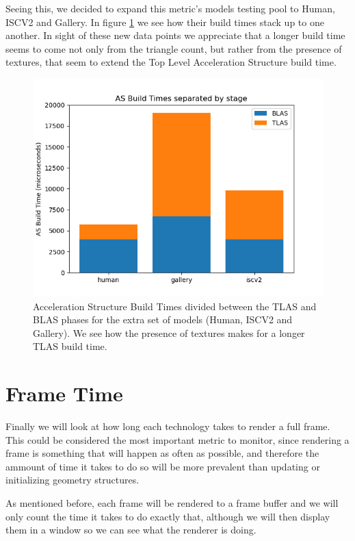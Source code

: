 Seeing this, we decided to expand this metric's models testing pool to Human, ISCV2 and Gallery. In figure \ref{as-extra-build-time-decomposed} we see how their build times stack up to one another. In sight of these new data points we appreciate that a longer build time seems to come not only from the triangle count, but rather from the presence of textures, that seem to extend the Top Level Acceleration Structure build time.


\begin{figure}[hbt!]
    \centering
    \includegraphics[width=1.0\textwidth]{figuras/optix-extra-accelbuildtimes-decomposed.png}
    \caption{Acceleration Structure Build Times divided between the TLAS and BLAS phases for the extra set of models (Human, ISCV2 and Gallery). We see how the presence of textures makes for a longer TLAS build time.}
    \label{as-extra-build-time-decomposed}
\end{figure}
\clearpage
\section{Frame Time}
Finally we will look at how long each technology takes to render a full frame. This could be considered the most important metric to monitor, since rendering a frame is something that will happen as often as possible, and therefore the ammount of time it takes to do so will be more prevalent than updating or initializing geometry structures.

As mentioned before, each frame will be rendered to a frame buffer and we will only count the time it takes to do exactly that, although we will then display them in a window so we can see what the renderer is doing.

